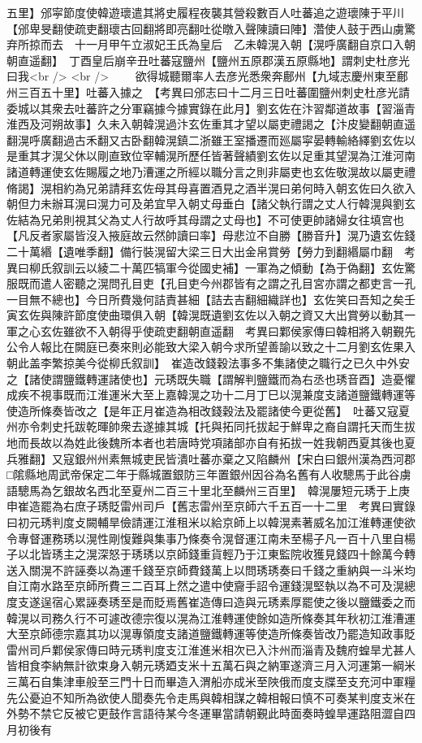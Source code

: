 五里】邠寜節度使韓遊瓌遣其將史履程夜襲其營殺數百人吐蕃追之遊瓌陳于平川【邠卑旻翻使疏吏翻瓌古回翻將即亮翻吐從暾入聲陳讀曰陣】濳使人鼓于西山虜驚弃所掠而去　十一月甲午立淑妃王氏為皇后　乙未韓滉入朝【滉呼廣翻自京口入朝朝直遥翻】　丁酉皇后崩辛丑吐蕃寇鹽州【鹽州五原郡漢五原縣地】謂刺史杜彦光曰我<br />
<br />
　　欲得城聽爾率人去彦光悉衆奔鄜州【九域志慶州東至鄜州三百五十里】吐蕃入據之　【考異曰邠志曰十二月三日吐蕃圍鹽州刺史杜彦光請委城以其衆去吐蕃許之分軍竊據今據實錄在此月】劉玄佐在汴習鄰道故事【習淄青淮西及河朔故事】久未入朝韓滉過汴玄佐重其才望以屬吏禮謁之【汴皮變翻朝直遥翻滉呼廣翻過古禾翻又古卧翻韓滉鎮二浙雖王室播遷而廵屬寜晏轉輸絡繹劉玄佐以是重其才滉父休以剛直致位宰輔滉所歷任皆著聲績劉玄佐以足重其望滉為江淮河南諸道轉運使玄佐賜履之地乃漕運之所經以職分言之則非屬吏也玄佐敬滉故以屬吏禮脩謁】滉相約為兄弟請拜玄佐母其母喜置酒見之酒半滉曰弟何時入朝玄佐曰久欲入朝但力未辦耳滉曰滉力可及弟宜早入朝丈母垂白【諸父執行謂之丈人行韓滉與劉玄佐結為兄弟則視其父為丈人行故呼其母謂之丈母也】不可使更帥諸婦女往填宫也【凡反者家屬皆沒入掖庭故云然帥讀曰率】母悲泣不自勝【勝音升】滉乃遺玄佐錢二十萬緡【遺唯季翻】備行裝滉留大梁三日大出金帛賞勞【勞力到翻緡屬巾翻　考異曰柳氏叙訓云以綾二十萬匹犒軍今從國史補】一軍為之傾動【為于偽翻】玄佐驚服既而遣人密聽之滉問孔目吏【孔目吏今州郡皆有之謂之孔目宮亦謂之都吏言一孔一目無不總也】今日所費幾何詰責甚細【詰去吉翻細織詳也】玄佐笑曰吾知之矣壬寅玄佐與陳許節度使曲環俱入朝【韓滉既遺劉玄佐以入朝之資又大出賞勞以動其一軍之心玄佐雖欲不入朝得乎使疏吏翻朝直遥翻　考異曰鄴侯家傳曰韓相將入朝覲先公令人報比在闕庭已奏來則必能致大梁入朝今求所望善諭以致之十二月劉玄佐果入朝此盖李繁掠美今從柳氏叙訓】　崔造改錢穀法事多不集諸使之職行之已久中外安之【諸使謂鹽鐵轉運諸使也】元琇既失職【謂解判鹽鐵而為右丞也琇音酉】造憂懼成疾不視事既而江淮運米大至上嘉韓滉之功十二月丁巳以滉兼度支諸道鹽鐵轉運等使造所條奏皆改之【是年正月崔造為相改錢穀法及罷諸使今更從舊】　吐蕃又寇夏州亦令刺史托跋乾暉帥衆去遂據其城【托與拓同托拔起于鮮卑之裔自謂托天而生拔地而長故以為姓此後魏所本者也若唐時党項諸部亦自有拓拔一姓我朝西夏其後也夏兵雅翻】又寇銀州州素無城吏民皆潰吐蕃亦棄之又陷麟州【宋白曰銀州漢為西河郡□隂縣地周武帝保定二年于縣城置銀防三年置銀州因谷為名舊有人收驄馬于此谷虜語驄馬為乞銀故名西北至夏州二百三十里北至麟州三百里】　韓滉屢短元琇于上庚申崔造罷為右庶子琇貶雷州司戶【舊志雷州至京師六千五百一十二里　考異曰實錄曰初元琇判度攴闕輔旱儉請運江淮租米以給京師上以韓滉素著威名加江淮轉運使欲令專督運務琇以滉性剛愎難與集事乃條奏令滉督運江南未至楊子凡一百十八里自楊子以北皆琇主之滉深怒于琇琇以京師錢重貨輕乃于江東監院收獲見錢四十餘萬今轉送入關滉不許誣奏以為運千錢至京師費錢萬上以問琇琇奏曰千錢之重納與一斗米均自江南水路至京師所費三二百耳上然之遣中使齎手詔令運錢滉堅執以為不可及滉總度支遂逞宿心累誣奏琇至是而貶焉舊崔造傳曰造與元琇素厚罷使之後以鹽鐵委之而韓滉以司務久行不可遽改德宗復以滉為江淮轉運使餘如造所條奏其年秋初江淮漕運大至京師德宗嘉其功以滉專領度支諸道鹽鐵轉運等使造所條奏皆改乃罷造知政事貶雷州司戶鄴侯家傳曰時元琇判度支江淮進米相次已入汴州而淄青及魏府蝗旱尤甚人皆相食李納無計欲束身入朝元琇廼支米十五萬石與之納軍遂濟三月入河運第一綱米三萬石自集津車般至三門十日而畢造入渭船亦成米至陜俄而度支牒至支充河中軍糧先公憂迫不知所為欲使人聞奏先令走馬與韓相謀之韓相報曰慎不可奏某判度支米在外勢不禁它反被它更鼓作言語待某今冬運畢當請朝覲此時面奏時蝗旱運路阻澀自四月初後有